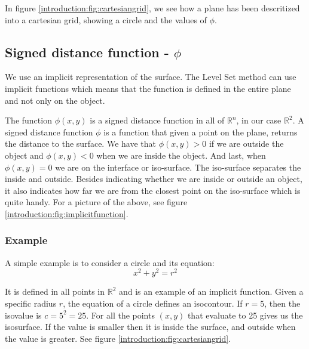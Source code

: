 In figure \vref{introduction:fig:cartesiangrid}, we see how a plane has been descritized into a cartesian grid, showing a circle and the values of $\phi$.

\subsection{Signed distance function -  $\phi$}

We use an implicit representation of the surface. The Level Set method can use implicit functions which means that the function is defined in the entire plane and not only on the object.

The function $\phi(x,y)$ is a signed distance function in all of
$\mathbb{R}^{n}$, in our case $\mathbb{R}^{2}$. A signed distance
function $\phi$ is a function that given a point on the plane, returns
the distance to the surface. We have that $\phi(x,y) > 0$ if we are
outside the object and $\phi(x,y) < 0$ when we are inside the object.
And last, when $\phi(x,y) = 0$ we are on the interface or iso-surface. 
The iso-surface separates the inside and outside.  Besides indicating
whether we are inside or outside an object, it also indicates how far
we are from the closest point on the iso-surface which is quite
handy. For a picture of the above, see figure
\vref{introduction:fig:implicitfunction}.



\subsubsection{Example}

A simple example is to consider a circle and its equation:
\begin{equation*}
  x^{2} + y^{2} = r^{2}
\end{equation*}

It is defined in all points in $\mathbb{R}^{2}$ and is an example of an implicit function. Given a specific radius $r$, the equation of a circle defines an isocontour. If $r = 5$, then the isovalue is $c = 5^{2} = 25$. For all the points $(x,y)$ that evaluate to 25 gives us the isosurface. If the value is smaller then it is inside the surface, and outside when the value is greater. See figure \vref{introduction:fig:cartesiangrid}.

